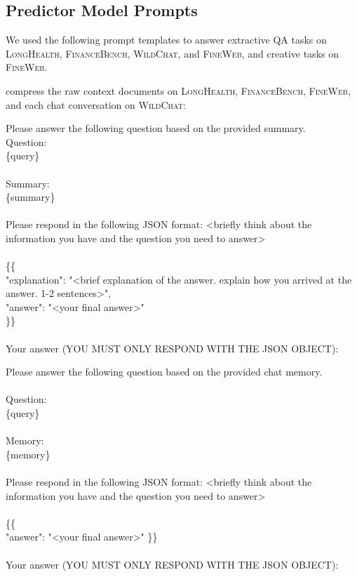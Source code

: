 \documentclass{article} %
\newcommand{\tab}{\hspace*{2em}}
\begin{document}
\subsection{Predictor Model Prompts}
\label{sec:appendix-prompts-prediction}
We used the following prompt templates to answer extractive QA tasks on \textsc{LongHealth}, \textsc{FinanceBench}, \textsc{WildChat}, and \textsc{FineWeb}, and creative tasks on \textsc{FineWeb}.

compress the raw context documents on \textsc{LongHealth}, \textsc{FinanceBench}, \textsc{FineWeb}, and each chat conversation on \textsc{WildChat}:

\begin{examplebox}
    \ttfamily
Please answer the following question based on the provided summary.\\
Question:\\
\{query\}\\
\\
Summary:\\
\{summary\}\\
\\
Please respond in the following JSON format:
<briefly think about the information you have and the question you need to answer>\\
\\
\{\{ \\
\tab "explanation": "<brief explanation of the answer. explain how you arrived at the answer. 1-2 sentences>", \\
\tab "answer": "<your final answer>" \\
\}\}\\
\\
Your answer (YOU MUST ONLY RESPOND WITH THE JSON OBJECT):
\end{examplebox}

\begin{examplebox}
    \ttfamily
Please answer the following question based on the provided chat memory.\\
\\
Question:\\
\{query\}\\
\\
Memory:\\
\{memory\}\\
\\
Please respond in the following JSON format:
<briefly think about the information you have and the question you need to answer>\\
\\
\{\{\\
\tab "answer": "<your final answer>"
\}\}\\
\\
Your answer (YOU MUST ONLY RESPOND WITH THE JSON OBJECT):
\end{examplebox}
\end{document}
